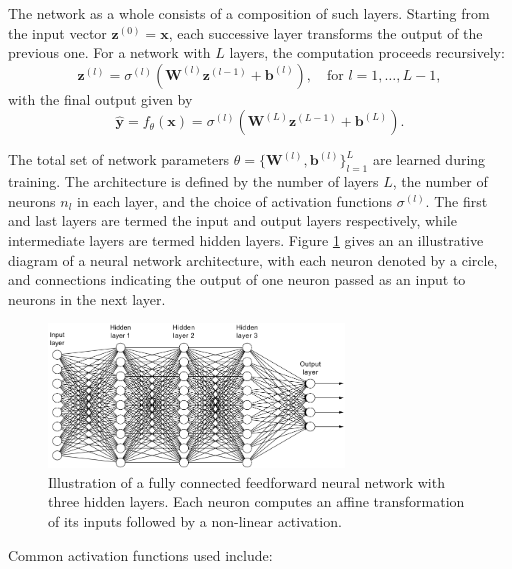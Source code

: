 The network as a whole consists of a composition of such layers. Starting from the input 
vector \( \mathbf{z}^{(0)} = \mathbf{x} \), each successive layer transforms the output of the previous
one. For a network with \( L \) layers, the computation proceeds recursively:
\[
    \mathbf{z}^{(l)} = \sigma^{(l)}\left( \mathbf{W}^{(l)} \mathbf{z}^{(l-1)} + \mathbf{b}^{(l)} 
    \right), \quad \text{for } l = 1, \dots, L-1,
\]
with the final output given by
\[
    \hat{\mathbf{y}} = f_\theta(\mathbf{x}) = \sigma^{(l)}(\mathbf{W}^{(L)} \mathbf{z}^{(L-1)} + 
    \mathbf{b}^{(L)}).
\]

The total set of network parameters \( \theta = \{ \mathbf{W}^{(l)}, \mathbf{b}^{(l)} \}_{l=1}^L \) 
are learned during training. The architecture is defined by the number of layers \( L \), the number 
of neurons \( n_l \) in each layer, and the choice of activation functions \( \sigma^{(l)} \).
The first and last layers are termed the input and output layers respectively, while intermediate 
layers are termed hidden layers. Figure \ref{fig:nn-architecture} gives an an illustrative diagram of 
a neural network architecture, with each neuron denoted by a circle, and connections indicating the
output of one neuron passed as an input to neurons in the next layer.

\begin{figure}[h]
    \centering
    \includegraphics[width=0.7\textwidth]{graphics/neural_network_image.png}
    \caption{Illustration of a fully connected feedforward neural network with three hidden layers. 
    Each neuron computes an affine transformation of its inputs followed by a non-linear activation.}
    \label{fig:nn-architecture}
\end{figure}


Common activation functions used include:

